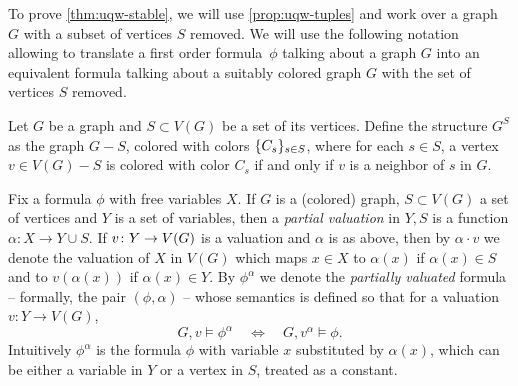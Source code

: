 \medskip
To prove \cref{thm:uqw-stable}, we will use \cref{prop:uqw-tuples} and work over a graph $G$
with a subset of vertices $S$ removed.
We will use the following notation allowing to translate a first order formula~$\phi$ talking about a graph $G$ into an equivalent formula talking 
about a suitably colored  graph $G$ with the set of vertices $S$ removed.

Let $G$ be a graph and $S\subset V(G)$
be a set of its vertices.
Define the structure $G^{S}$
as the graph $G-S$, colored with colors $\{C_s\}_{s\in S}$,
where for each $s\in S$, a vertex $v\in V(G)-S$
is colored with color $C_s$ if and only if $v$ is a neighbor of $s$
in $G$.

Fix a formula $\phi$ with free variables $X$.
If $G$ is a (colored) graph, $S\subset V(G)$ a set of vertices and $Y$ is a set of variables, then 
a \emph{partial valuation} in $Y,S$ is a 
function $\alpha\colon X\to Y\cup S$.
If $v\colon Y\to V(G)$ is a valuation and $\alpha$ is as above,
then by $\alpha\cdot v$ we denote the valuation of $X$ in $V(G)$
which maps $x\in X$ to $\alpha(x) $ if $\alpha(x)\in S$
and to $v(\alpha(x))$ if $\alpha(x)\in Y$.
By $\phi^{\alpha}$ we denote the \emph{partially valuated} formula -- formally, the pair $(\phi,\alpha)$ -- whose semantics is defined so that for a valuation $v:Y\to V(G)$, 
$$G,v\models \phi^{\alpha}\quad\Leftrightarrow \quad G,v^\alpha\models \phi.$$
Intuitively $\phi^\alpha$ is the formula $\phi$ with variable $x$ substituted by $\alpha(x)$,
which can be either a variable in $Y$ or a vertex in $S$, treated as a constant.


